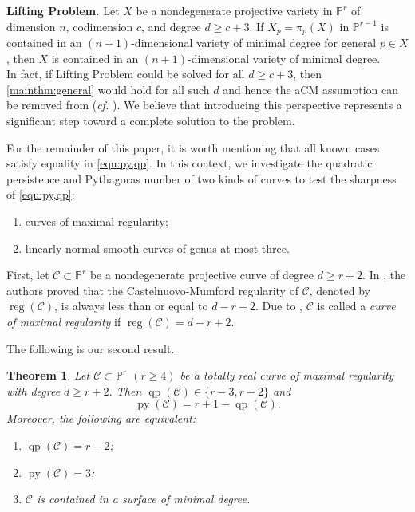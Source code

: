 \documentclass[11pt,letterpaper,reqno]{amsart}
\theoremstyle{plain}
\newtheorem{theorem}{Theorem}[section]
\theoremstyle{definition}
\newtheorem{open problem}[theorem]{Open Problem}
\newtheorem{remark and notation}[theorem]{Remark and Notation}
\newtheorem{remark and definition}[theorem]{Remark and Definition}
\newtheorem{definition and notation}[theorem]{Definition and Notation}
\newtheorem{notation and convention}[theorem]{Notation and Convention}
\newtheorem{notation and remark}[theorem]{Notation and Remark}
\newtheorem{convention and notation}[theorem]{Convention and Notation}
\def \p {\mathbb{P}}
\def \reg {\operatorname{reg}}
\def \py {\operatorname{py}}
\def \qp {\operatorname{qp}}
\begin{document}
\noindent\textbf{Lifting Problem.}
    Let $X$ be a nondegenerate projective variety in $\p^{r}$ of dimension $n$, codimension $c$, and degree $d\geq c+3$.
    If $X_p = \pi_p(X)$ in $\p^{r-1}$ is contained in an $(n+1)$-dimensional variety of minimal degree for general $p\in X$, then $X$ is contained in an $(n+1)$-dimensional variety of minimal degree.\\

In fact, if Lifting Problem could be solved for all $d  \geq c+3$, then  \eqref{mainthm:general} would hold for all such $d$ and hence the aCM assumption can be removed from  (\textit{cf.} ).
We believe that introducing this perspective represents a significant step toward a complete solution to the problem.

For the remainder of this paper, it is worth mentioning that all known cases satisfy equality in \eqref{equ:py,qp}.
In this context, we investigate the quadratic persistence and Pythagoras number of two kinds of curves to test the sharpness of \eqref{equ:py,qp}: \\
\begin{enumerate}
    \item[(a)] curves of maximal regularity;
    \item[(b)] linearly normal smooth curves of genus at most three. \\
\end{enumerate}

First, let $\mathcal{C} \subset \p^r$ be a nondegenerate projective curve of degree $d \geq r+2$. In \cite{MR0704401}, the authors proved that the Castelnuovo-Mumford regularity of $\mathcal{C}$, denoted by $\reg(\mathcal{C})$, is always less than or equal to $d-r+2$. Due to \cite{MR1992539}, $\mathcal{C}$ is called a \textit{curve of maximal regularity} if $\reg(\mathcal{C})=d-r+2$.

The following is our second result.
\begin{theorem}\label{mainthm:cmr}
    Let $\mathcal{C} \subset \mathbb{P}^r$ $(r \geq 4)$ be a totally real curve of maximal regularity with degree $d \geq r + 2$.
    Then $\qp(\mathcal{C})\in \{r-3, r-2\}$ and 
    $$\py(\mathcal{C}) = r + 1 - \qp(\mathcal{C}).$$ 
    Moreover, the following are equivalent:
    \begin{enumerate}[\rm (i)]
        \item $\qp(\mathcal{C}) = r-2$;
        \item $\py(\mathcal{C})=3$;
        \item $\mathcal{C}$ is contained in a surface of minimal degree.
    \end{enumerate}
\end{theorem}
 
\end{document}
